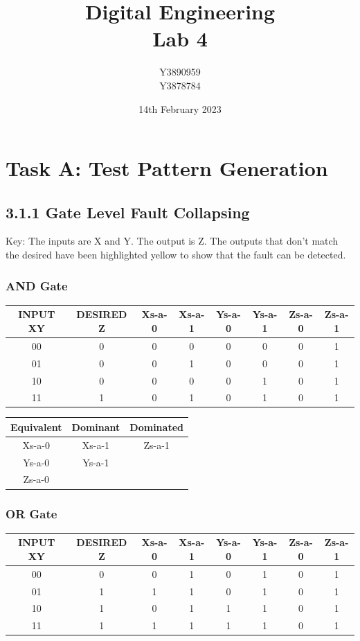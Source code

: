 \documentclass[11pt]{report}
\title{Digital Engineering\\Lab 4}
\author{Y3890959\\Y3878784}
\date{14th February 2023}
\begin{document}
\maketitle

\chapter*{Task A: Test Pattern Generation}

\section*{3.1.1 Gate Level Fault Collapsing}
Key: The inputs are X and Y. The output is Z. The outputs that don't match the desired have been highlighted yellow to show that the fault can be detected.

\subsection*{AND Gate}
\begin{tabular}{ |c|c|c|c|c|c|c|c| }
\hline
INPUT XY & DESIRED Z & Xs-a-0 & Xs-a-1 & Ys-a-0 & Ys-a-1 & Zs-a-0 & Zs-a-1
\\ 
\hline
\hline
00 & 0 & 0 & 0 & 0 & 0 & 0 & \cellcolor{yellow!50}1
\\  
\hline
01 & 0 & 0 & \cellcolor{yellow!50}1 & 0 & 0 & 0 & \cellcolor{yellow!50}1
\\
\hline
10 & 0 & 0 & 0 & 0 & \cellcolor{yellow!50}1 & 0 & \cellcolor{yellow!50}1
\\
\hline
11 & 1 & \cellcolor{yellow!50}0 & 1 & \cellcolor{yellow!50}0 & 1 & \cellcolor{yellow!50}0 & 1
\\
\hline
\end{tabular}

\begin{tabular}{ |c|c|c| }
\hline
Equivalent & Dominant & Dominated
\\ 
\hline
\hline
Xs-a-0 & Xs-a-1 & Zs-a-1
\\  
\hline
Ys-a-0 & Ys-a-1 & 
\\
\hline
Zs-a-0 & & 
\\
\hline
\end{tabular}



\subsection*{OR Gate}
\begin{tabular}{ |c|c|c|c|c|c|c|c| }
\hline
INPUT XY & DESIRED Z & Xs-a-0 & Xs-a-1 & Ys-a-0 & Ys-a-1 & Zs-a-0 & Zs-a-1
\\ 
\hline
\hline
00 & 0 & 0 & \cellcolor{yellow!50}1 & 0 & \cellcolor{yellow!50}1 & 0 & \cellcolor{yellow!50}1
\\  
\hline
01 & 1 & 1 & 1 & \cellcolor{yellow!50}0 & 1 & \cellcolor{yellow!50}0 & 1
\\
\hline
10 & 1 & \cellcolor{yellow!50}0 & 1 & 1 & 1 & \cellcolor{yellow!50}0 & 1
\\
\hline
11 & 1 & 1 & 1 & 1 & 1 & \cellcolor{yellow!50}0 & 1
\\
\hline
\end{tabular}
\end{document}
